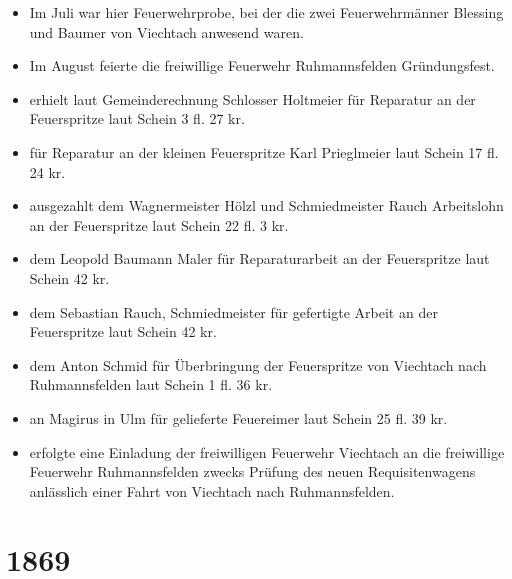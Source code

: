 \documentclass[12pt,a4paper]{book}
\begin{document}
\begin{itemize}
\item Im Juli war hier Feuerwehrprobe, bei der die zwei Feuerwehrmänner Blessing
und Baumer von Viechtach anwesend waren.

\item Im August feierte die freiwillige Feuerwehr Ruhmannsfelden Gründungsfest.

\item erhielt laut Gemeinderechnung Schlosser Holtmeier für Reparatur an der
Feuerspritze laut Schein 3 fl. 27 kr.

\item für Reparatur an der kleinen Feuerspritze Karl Prieglmeier laut Schein 17
fl. 24 kr.

\item ausgezahlt dem Wagnermeister Hölzl und Schmiedmeister Rauch Arbeitslohn an
der Feuerspritze laut Schein 22 fl. 3 kr.

\item dem Leopold Baumann Maler für Reparaturarbeit an der Feuerspritze laut
Schein 42 kr.

\item dem Sebastian Rauch, Schmiedmeister für gefertigte Arbeit an der
Feuerspritze laut Schein 42 kr.

\item dem Anton Schmid für Überbringung der Feuerspritze von Viechtach nach
Ruhmannsfelden laut Schein 1 fl. 36 kr.

\item an Magirus in Ulm für gelieferte Feuereimer laut Schein 25 fl. 39 kr.

\item erfolgte eine Einladung der freiwilligen Feuerwehr Viechtach an die
freiwillige Feuerwehr Ruhmannsfelden zwecks Prüfung des neuen Requisitenwagens
anlässlich einer Fahrt von Viechtach nach Ruhmannsfelden.
\end{itemize}

\section*{1869}
\end{document}
